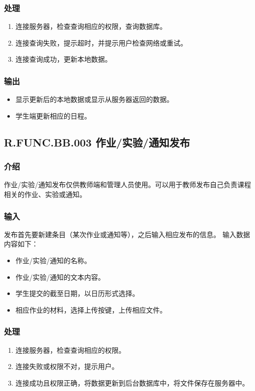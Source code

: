       \subsubsection{处理}
      \begin{enumerate}
        \item 连接服务器，检查查询相应的权限，查询数据库。
        \item 连接查询失败，提示超时，并提示用户检查网络或重试。
        \item 连接查询成功，更新本地数据。
      \end{enumerate}
      \subsubsection{输出}
      \begin{itemize}
        \item 显示更新后的本地数据或显示从服务器返回的数据。
        \item 学生端更新相应的日程。
      \end{itemize}

    \subsection{R.FUNC.BB.003 作业/实验/通知发布}
      \subsubsection{介绍}
      作业/实验/通知发布仅供教师端和管理人员使用。可以用于教师发布自己负责课程相关的作业、实验或通知。
      \subsubsection{输入}
      发布首先要新建条目（某次作业或通知等），之后输入相应发布的信息。
      输入数据内容如下：
      \begin{itemize}
        \item 作业/实验/通知的名称。
        \item 作业/实验/通知的文本内容。
        \item 学生提交的截至日期，以日历形式选择。
        \item 相应作业的材料，选择上传按键，上传相应文件。
      \end{itemize}
      \subsubsection{处理}
      \begin{enumerate}
        \item 连接服务器，检查查询相应的权限。
        \item 连接失败或权限不对，提示用户。
        \item 连接成功且权限正确，将数据更新到后台数据库中，将文件保存在服务器中。
      \end{enumerate}
